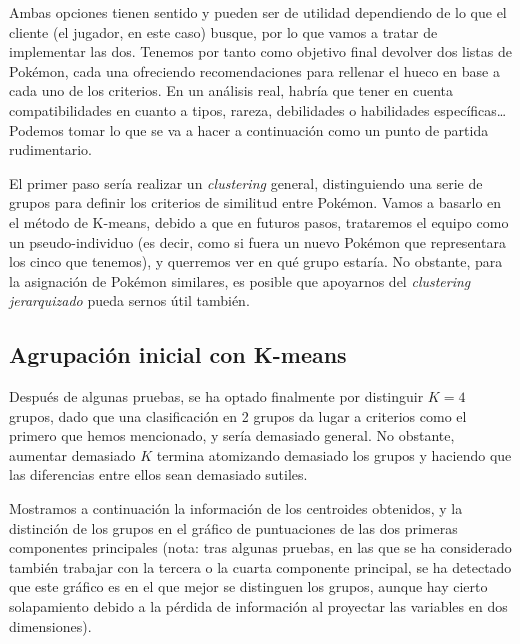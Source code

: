 \documentclass[
  11.8pt,
]{extreport}
\begin{document}
Ambas opciones tienen sentido y pueden ser de utilidad dependiendo de lo
que el cliente (el jugador, en este caso) busque, por lo que vamos a
tratar de implementar las dos. Tenemos por tanto como objetivo final
devolver dos listas de Pokémon, cada una ofreciendo recomendaciones para
rellenar el hueco en base a cada uno de los criterios. En un análisis
real, habría que tener en cuenta compatibilidades en cuanto a tipos,
rareza, debilidades o habilidades específicas\ldots{} Podemos tomar lo
que se va a hacer a continuación como un punto de partida rudimentario.

El primer paso sería realizar un \emph{clustering} general,
distinguiendo una serie de grupos para definir los criterios de
similitud entre Pokémon. Vamos a basarlo en el método de K-means, debido
a que en futuros pasos, trataremos el equipo como un pseudo-individuo
(es decir, como si fuera un nuevo Pokémon que representara los cinco que
tenemos), y querremos ver en qué grupo estaría. No obstante, para la
asignación de Pokémon similares, es posible que apoyarnos del
\emph{clustering jerarquizado} pueda sernos útil también.

\subsection{Agrupación inicial con
K-means}\label{agrupaciuxf3n-inicial-con-k-means}

Después de algunas pruebas, se ha optado finalmente por distinguir
\(K = 4\) grupos, dado que una clasificación en 2 grupos da lugar a
criterios como el primero que hemos mencionado, y sería demasiado
general. No obstante, aumentar demasiado \(K\) termina atomizando
demasiado los grupos y haciendo que las diferencias entre ellos sean
demasiado sutiles.

Mostramos a continuación la información de los centroides obtenidos, y
la distinción de los grupos en el gráfico de puntuaciones de las dos
primeras componentes principales (nota: tras algunas pruebas, en las que
se ha considerado también trabajar con la tercera o la cuarta componente
principal, se ha detectado que este gráfico es en el que mejor se
distinguen los grupos, aunque hay cierto solapamiento debido a la
pérdida de información al proyectar las variables en dos dimensiones).
\end{document}
